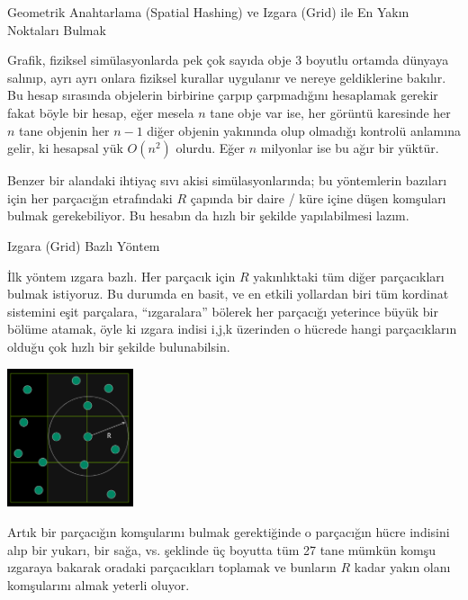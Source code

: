 \documentclass[12pt,fleqn]{article}\usepackage{../../common}
\begin{document}
Geometrik Anahtarlama (Spatial Hashing) ve Izgara (Grid) ile En Yakın Noktaları Bulmak

Grafik, fiziksel simülasyonlarda pek çok sayıda obje 3 boyutlu ortamda dünyaya
salınıp, ayrı ayrı onlara fiziksel kurallar uygulanır ve nereye geldiklerine
bakılır. Bu hesap sırasında objelerin birbirine çarpıp çarpmadığını hesaplamak
gerekir fakat böyle bir hesap, eğer mesela $n$ tane obje var ise, her görüntü
karesinde her $n$ tane objenin her $n-1$ diğer objenin yakınında olup olmadığı
kontrolü anlamına gelir, ki hesapsal yük $O(n^2)$ olurdu. Eğer $n$ milyonlar ise
bu ağır bir yüktür.

Benzer bir alandaki ihtiyaç sıvı akisi simülasyonlarında; bu yöntemlerin
bazıları için her parçacığın etrafındaki $R$ çapında bir daire / küre içine
düşen komşuları bulmak gerekebiliyor. Bu hesabın da hızlı bir şekilde
yapılabilmesi lazım.

Izgara (Grid) Bazlı Yöntem

İlk yöntem ızgara bazlı. Her parçacık için $R$ yakınlıktaki tüm diğer
parçacıkları bulmak istiyoruz. Bu durumda en basit, ve en etkili yollardan biri
tüm kordinat sistemini eşit parçalara, ``ızgaralara'' bölerek her parçacığı
yeterince büyük bir bölüme atamak, öyle ki ızgara indisi i,j,k üzerinden o
hücrede hangi parçacıkların olduğu çok hızlı bir şekilde bulunabilsin.

\includegraphics[width=10em]{algs_073_hash_03.png}

Artık bir parçacığın komşularını bulmak gerektiğinde o parçacığın hücre indisini
alıp bir yukarı, bir sağa, vs. şeklinde üç boyutta tüm 27 tane mümkün komşu
ızgaraya bakarak oradaki parçacıkları toplamak ve bunların $R$ kadar yakın olanı
komşularını almak yeterli oluyor.
\end{document}

